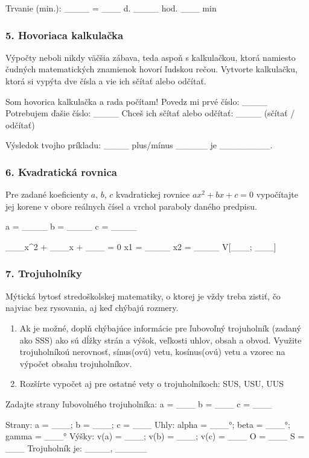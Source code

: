 \begin{code}
Trvanie (min.): ____
= ___ d. ____ hod. ___ min
\end{code}


\subsubsection*{5. Hovoriaca kalkulačka}
Výpočty neboli nikdy väčšia zábava, teda aspoň s kalkulačkou, ktorá namiesto čudných matematických znamienok hovorí ľudskou rečou. Vytvorte kalkulačku, ktorá si vypýta dve čísla a vie ich sčítať alebo odčítať.

\begin{code}
Som hovorica kalkulačka a rada počítam!
Povedz mi prvé číslo: ____
Potrebujem ďašie číslo: ____
Chceš ich sčítať alebo odčítať: ____ (sčítať / odčítať)

Výsledok tvojho príkladu: ____ plus/mínus _____ je ________.
\end{code}

\subsubsection*{6. Kvadratická rovnica}
Pre zadané koeficienty $a$, $b$, $c$ kvadratickej rovnice $ax^2 + bx + c = 0$  vypočítajte jej korene v obore reálnych čísel a vrchol paraboly daného predpisu.

\begin{code}
a = ____
b = ____
c = ____

___x^2 + ___x + ___ = 0
x1 = ____
x2 = ____
V[___; ___]
\end{code}

\subsubsection*{7. Trojuholníky}
Mýtická bytosť stredoškolskej matematiky, o ktorej je vždy treba zistiť, čo najviac bez rysovania, aj keď chýbajú rozmery.

\begin{enumerate}[label=\alph*)]
\item Ak je možné, doplň chýbajúce informácie pre ľubovoľný trojuholník (zadaný ako SSS) ako sú dĺžky strán a výšok, veľkosti uhlov, obsah a obvod. Využite trojuholníkoú nerovnosť, sínus(ovú) vetu, kosínus(ovú) vetu a vzorec na výpočet obsahu trojuholníkov.
\item Rozšírte vypočet aj pre ostatné vety o trojuholníkoch: SUS, USU, UUS
\end{enumerate}

\begin{code}
Zadajte strany ľubovolného trojuholníka:
a = ___
b = ___
c = ___

Strany: a = ___; b = ___; c = ___
Uhly: alpha = ___°; beta = ___°; gamma = ___°
Výšky: v(a) = ___; v(b) = ___; v(c) = ___
O = ___
S = ___
Trojuholník je: ____, _____
\end{code}
 
